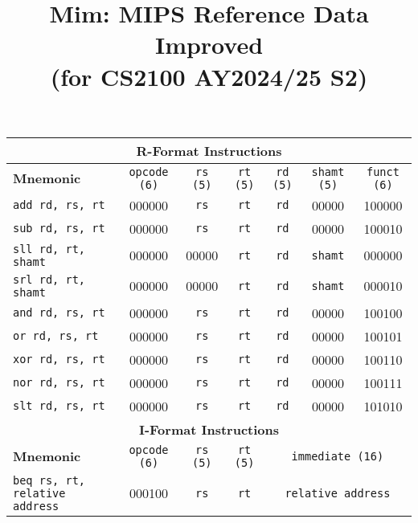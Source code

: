 \documentclass[a4paper, 10pt]{article}
\title{\textbf{Mim: MIPS Reference Data Improved \\(for CS2100 AY2024/25 S2)}}
\date{}
\begin{document}
\maketitle
{}
\begin{table}[ht]
    \centering
    \renewcommand{\arraystretch}{1.2}
    \begin{tabular}{|l|c|c|c|c|c|c|}
        \hline
        \multicolumn{7}{|c|}{\textbf{R-Format Instructions}} \\ \hline
        \textbf{Mnemonic} & \texttt{opcode (6)} & \texttt{rs (5)} & \texttt{rt (5)} & \texttt{rd (5)} & \texttt{shamt (5)} & \texttt{funct (6)} \\ \hline
        \texttt{add rd, rs, rt}    & 000000 & \texttt{rs}    & \texttt{rt}    & \texttt{rd}    & 00000 & 100000 \\ \hline
        \texttt{sub rd, rs, rt}    & 000000 & \texttt{rs}    & \texttt{rt}    & \texttt{rd}    & 00000 & 100010 \\ \hline
        \texttt{sll rd, rt, shamt} & 000000 & 00000         & \texttt{rt}    & \texttt{rd}    & \texttt{shamt} & 000000 \\ \hline
        \texttt{srl rd, rt, shamt} & 000000 & 00000         & \texttt{rt}    & \texttt{rd}    & \texttt{shamt} & 000010 \\ \hline
        \texttt{and rd, rs, rt}    & 000000 & \texttt{rs}    & \texttt{rt}    & \texttt{rd}    & 00000 & 100100 \\ \hline
        \texttt{or rd, rs, rt}     & 000000 & \texttt{rs}    & \texttt{rt}    & \texttt{rd}    & 00000 & 100101 \\ \hline
        \texttt{xor rd, rs, rt}    & 000000 & \texttt{rs}    & \texttt{rt}    & \texttt{rd}    & 00000 & 100110 \\ \hline
        \texttt{nor rd, rs, rt}    & 000000 & \texttt{rs}    & \texttt{rt}    & \texttt{rd}    & 00000 & 100111 \\ \hline
        \texttt{slt rd, rs, rt}    & 000000 & \texttt{rs}    & \texttt{rt}    & \texttt{rd}    & 00000 & 101010 \\ \hline
        \multicolumn{7}{|c|}{\textbf{I-Format Instructions}} \\ \hline
        \textbf{Mnemonic} & \texttt{opcode (6)} & \texttt{rs (5)} & \texttt{rt (5)} & \multicolumn{3}{c|}{\texttt{immediate (16)}} \\ \hline
        \texttt{beq rs, rt, relative address}   & 000100 & \texttt{rs}   & \texttt{rt}   & \multicolumn{3}{c|}{\texttt{relative address}}  \\ \hline

\end{tabular}
\end{table}
\end{document}
